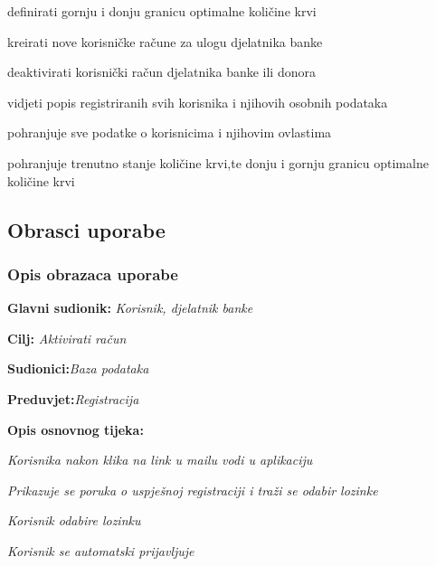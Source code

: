 \begin{packed_enum}
\begin{packed_enum}
		\item definirati gornju i donju granicu optimalne količine krvi
		\item kreirati nove korisničke račune za ulogu djelatnika banke
		\item deaktivirati korisnički račun djelatnika banke ili donora
		\item vidjeti popis registriranih svih korisnika i njihovih osobnih podataka
		
	\end{packed_enum}
	
	\item  {}
	
	\begin{packed_enum}
		
		\item pohranjuje sve podatke o korisnicima i njihovim ovlastima
		\item pohranjuje trenutno stanje količine krvi,te donju i gornju granicu optimalne količine krvi
		
	\end{packed_enum}
\end{packed_enum}

\eject 



\subsection{Obrasci uporabe}

\subsubsection{Opis obrazaca uporabe}

\noindent {}
\begin{packed_item}
	
	\item \textbf{Glavni sudionik: }\textit{Korisnik, djelatnik banke}\eject
	\item  \textbf{Cilj:} \textit{Aktivirati račun}\eject
	\item  \textbf{Sudionici:}\textit{Baza podataka}\eject 
	\item  \textbf{Preduvjet:}\textit{Registracija}\eject
	\item  \textbf{Opis osnovnog tijeka:}
	
	\item[] \begin{packed_enum}
		
		\item \textit{Korisnika nakon klika na link u mailu vodi u aplikaciju}\eject
		\item \textit{Prikazuje se poruka o uspješnoj registraciji i traži se odabir lozinke}\eject 
		\item \textit{Korisnik odabire lozinku}\eject 
		\item \textit{Korisnik se automatski prijavljuje}\eject
		
	\end{packed_enum}
	
\end{packed_item}

